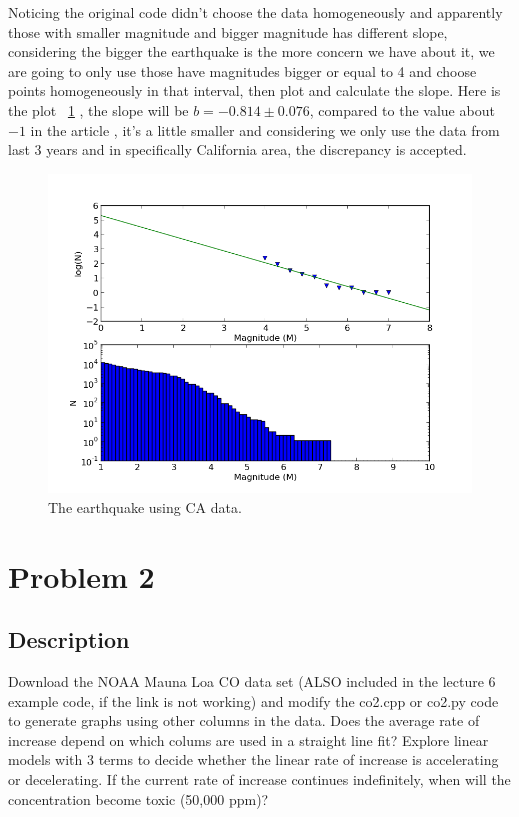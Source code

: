 \documentclass[11pt,letterpaper]{article}
\begin{document}
Noticing the original code didn't choose the data homogeneously and apparently those with smaller magnitude and bigger magnitude has different slope, considering the bigger the earthquake is the more concern we have about it, we are going to only use those have magnitudes bigger or equal to 4 and choose points homogeneously in that interval, then plot and calculate the slope. Here is the plot ~\ref{figure1} 
, the slope will be $b=-0.814\pm0.076$, compared to the value about $-1$ in the article \cite{The Physics of Earthquakes}, it's a little smaller and considering we only use the data from last 3 years and in specifically California area, the discrepancy is accepted.
 
\begin{figure}
\begin{center}
\includegraphics[width=0.6\linewidth,angle=0]{quake.png}
\caption{The earthquake using CA data.}
\label{figure1}
\end{center}
\end{figure}




\newpage

\section{Problem 2}

\subsection{Description}

Download the NOAA Mauna Loa CO  data set (ALSO included in the lecture 6 example code, if the link is not working) and modify the co2.cpp or co2.py code to generate graphs using other columns in the data. Does the average rate of increase depend on which colums are used in a straight line fit? Explore linear models with 3 terms to decide whether the linear rate of increase is accelerating or decelerating. If the current rate of increase continues indefinitely, when will the concentration become toxic (50,000 ppm)?
\end{document}
